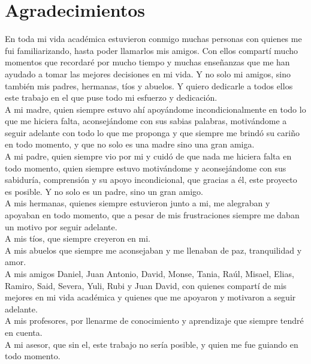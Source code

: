 \chapter*{Agradecimientos}
En toda mi vida académica estuvieron conmigo muchas personas con quienes me fui familiarizando, hasta poder llamarlos mis amigos. Con ellos compartí mucho momentos que recordaré por mucho tiempo y muchas enseñanzas que me han ayudado a tomar las mejores decisiones en mi vida. Y no solo mi amigos, sino también mis padres, hermanas, tíos y abuelos. Y quiero dedicarle a todos ellos este trabajo en el que puse todo mi esfuerzo y dedicación.\\

A mi madre, quien siempre estuvo ahí apoyándome incondicionalmente en todo lo que me hiciera falta, aconsejándome con sus sabias palabras, motivándome a seguir adelante con todo lo que me proponga y que siempre me brindó su cariño en todo momento, y que no solo es una madre sino una gran amiga.\\

A mi padre, quien siempre vio por mi y cuidó de que nada me hiciera falta en todo momento, quien siempre estuvo motivándome y aconsejándome con sus sabiduría, comprensión y su apoyo incondicional, que gracias a él, este proyecto es posible. Y no solo es un padre, sino un gran amigo.\\

A mis hermanas, quienes siempre estuvieron junto a mi, me alegraban y apoyaban en todo momento, que a pesar de mis frustraciones siempre me daban un motivo por seguir adelante.\\

A mis tíos, que siempre creyeron en mi.\\

A mis abuelos que siempre me aconsejaban y me llenaban de paz, tranquilidad y amor.\\

A mis amigos Daniel, Juan Antonio, David, Monse, Tania, Raúl, Misael, Elias, Ramiro, Said, Severa, Yuli, Rubi y Juan David, con quienes compartí de mis mejores en mi vida académica y quienes que me apoyaron y motivaron a seguir adelante.\\

A mis profesores, por llenarme de conocimiento y aprendizaje que siempre tendré en cuenta.\\

A mi asesor, que sin el, este trabajo no sería posible, y quien me fue guiando en todo momento.